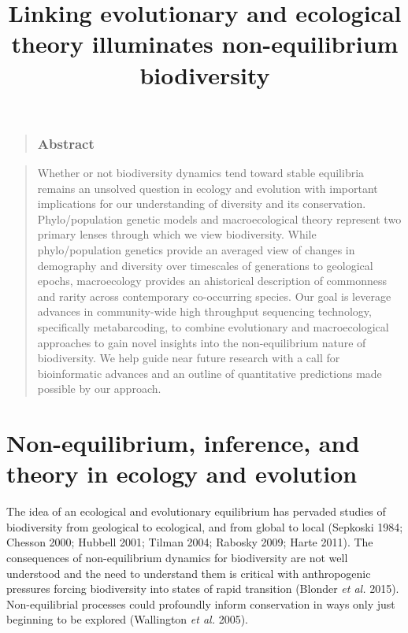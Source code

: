 \documentclass[
]{article}
\title{Linking evolutionary and ecological theory illuminates
non-equilibrium biodiversity}
\author{}
\date{\vspace{-2.5em}}
\begin{document}
\maketitle

\linenumbers

\begin{quote}
\hypertarget{abstract}{%
\subsubsection{Abstract}\label{abstract}}
\end{quote}

\begin{quote}
Whether or not biodiversity dynamics tend toward stable equilibria
remains an unsolved question in ecology and evolution with important
implications for our understanding of diversity and its conservation.
Phylo/population genetic models and macroecological theory represent two
primary lenses through which we view biodiversity. While
phylo/population genetics provide an averaged view of changes in
demography and diversity over timescales of generations to geological
epochs, macroecology provides an ahistorical description of commonness
and rarity across contemporary co-occurring species. Our goal is
leverage advances in community-wide high throughput sequencing
technology, specifically metabarcoding, to combine evolutionary and
macroecological approaches to gain novel insights into the
non-equilibrium nature of biodiversity. We help guide near future
research with a call for bioinformatic advances and an outline of
quantitative predictions made possible by our approach. \newline
\newline
\end{quote}

\hypertarget{non-equilibrium-inference-and-theory-in-ecology-and-evolution}{%
\section{Non-equilibrium, inference, and theory in ecology and
evolution}\label{non-equilibrium-inference-and-theory-in-ecology-and-evolution}}

The idea of an ecological and evolutionary equilibrium has pervaded
studies of biodiversity from geological to ecological, and from global
to local (Sepkoski 1984; Chesson 2000; Hubbell 2001; Tilman 2004;
Rabosky 2009; Harte 2011). The consequences of non-equilibrium dynamics
for biodiversity are not well understood and the need to understand them
is critical with anthropogenic pressures forcing biodiversity into
states of rapid transition (Blonder \emph{et al.} 2015). Non-equilibrial
processes could profoundly inform conservation in ways only just
beginning to be explored (Wallington \emph{et al.} 2005).
\end{document}
